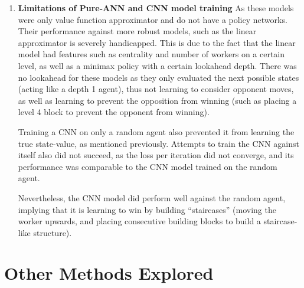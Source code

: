 \documentclass[a4paper,12pt,table]{article}
\begin{document}
\begin{enumerate}
    \item \textbf{Limitations of Pure-ANN and CNN model training}
    \newline
    As these models were only value function approximator and do not have a policy networks. Their performance against more robust models, such as the linear approximator is severely handicapped. This is due to the fact that the linear model had features such as centrality and number of workers on a certain level, as well as a minimax policy with a certain lookahead depth. There was no lookahead for these models as they only evaluated the next possible states (acting like a depth 1 agent), thus not learning to consider opponent moves, as well as learning to prevent the opposition from winning (such as placing a level 4 block to prevent the opponent from winning).  \par

    Training a CNN on only a random agent also prevented it from learning the true state-value, as mentioned previously. Attempts to train the CNN against itself also did not succeed, as the loss per iteration did not converge, and its performance was comparable to the CNN model trained on the random agent. \par

    Nevertheless, the CNN model did perform well against the random agent, implying that it is learning to win by building “staircases” (moving the worker upwards, and placing consecutive building blocks to build a staircase-like structure).  \par

\end{enumerate}

\section{Other Methods Explored}
\end{document}
